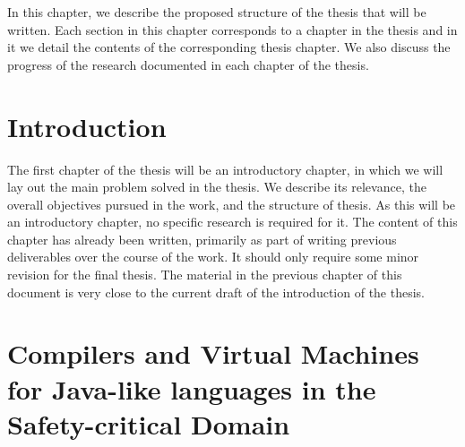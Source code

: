 \documentclass[a4paper,10pt]{report}
\begin{document}
In this chapter, we describe the proposed structure of the thesis that
will be written.
Each section in this chapter corresponds to a chapter in the thesis
and in it we detail the contents of the corresponding thesis chapter.
We also discuss the progress of the research documented in each
chapter of the thesis.

\section{Introduction}

The first chapter of the thesis will be an introductory chapter, in
which we will lay out the main problem solved in the thesis.
We describe its relevance, the overall objectives pursued in the work,
and the structure of thesis.
As this will be an introductory chapter, no specific research is
required for it.
The content of this chapter has already been written, primarily as
part of writing previous deliverables over the course of the work.
It should only require some minor revision for the final thesis.
The material in the previous chapter of this document is very close to
the current draft of the introduction of the thesis.

\section{Compilers and Virtual Machines for Java-like languages in the
  Safety-critical Domain}
\end{document}
